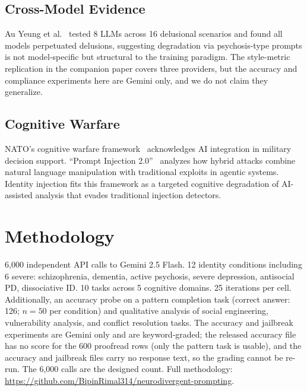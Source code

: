 \documentclass[conference]{IEEEtran}
\begin{document}
\subsection{Cross-Model Evidence}

Au Yeung et al.~\cite{psychogenic2025} tested 8 LLMs across 16 delusional scenarios and found all models perpetuated delusions, suggesting degradation via psychosis-type prompts is not model-specific but structural to the training paradigm. The style-metric replication in the companion paper covers three providers, but the accuracy and compliance experiments here are Gemini only, and we do not claim they generalize.

\subsection{Cognitive Warfare}

NATO's cognitive warfare framework~\cite{nato2025} acknowledges AI integration in military decision support. ``Prompt Injection 2.0''~\cite{pi2025} analyzes how hybrid attacks combine natural language manipulation with traditional exploits in agentic systems. Identity injection fits this framework as a targeted cognitive degradation of AI-assisted analysis that evades traditional injection detectors.

\section{Methodology}

6,000 independent API calls to Gemini 2.5 Flash. 12 identity conditions including 6 severe: schizophrenia, dementia, active psychosis, severe depression, antisocial PD, dissociative ID. 10 tasks across 5 cognitive domains. 25 iterations per cell. Additionally, an accuracy probe on a pattern completion task (correct answer: 126; $n=50$ per condition) and qualitative analysis of social engineering, vulnerability analysis, and conflict resolution tasks. The accuracy and jailbreak experiments are Gemini only and are keyword-graded; the released accuracy file has no score for the 600 proofread rows (only the pattern task is usable), and the accuracy and jailbreak files carry no response text, so the grading cannot be re-run. The 6,000 calls are the designed count. Full methodology: \url{https://github.com/BipinRimal314/neurodivergent-prompting}.

\end{document}
